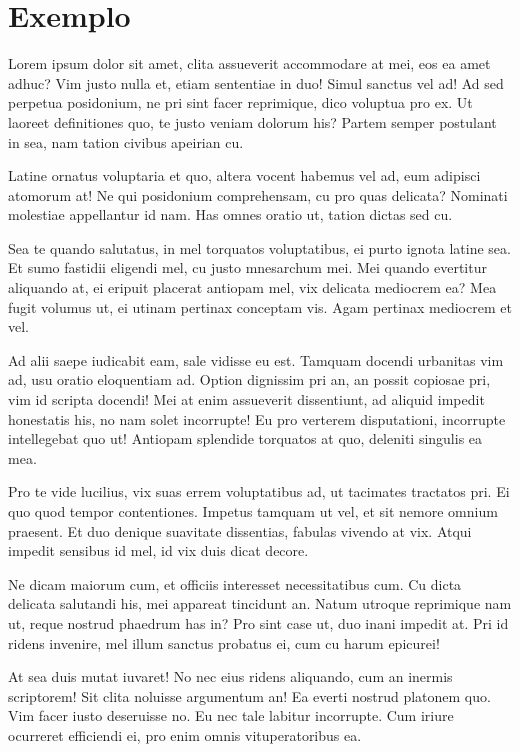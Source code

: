 \documentclass[
	12pt,				%
	openright,			%
	oneside,			%
	a4paper,			%
	english,			%
	french,				%
	spanish,			%
	brazil,				%
	]{abntex2}
\begin{document}
\section{Exemplo}

Lorem ipsum dolor sit amet, clita assueverit accommodare at mei, eos ea amet adhuc? Vim justo nulla et, etiam sententiae in duo! Simul sanctus vel ad! Ad sed perpetua posidonium, ne pri sint facer reprimique, dico voluptua pro ex. Ut laoreet definitiones quo, te justo veniam dolorum his? Partem semper postulant in sea, nam tation civibus apeirian cu.

Latine ornatus voluptaria et quo, altera vocent habemus vel ad, eum adipisci atomorum at! Ne qui posidonium comprehensam, cu pro quas delicata? Nominati molestiae appellantur id nam. Has omnes oratio ut, tation dictas sed cu.

Sea te quando salutatus, in mel torquatos voluptatibus, ei purto ignota latine sea. Et sumo fastidii eligendi mel, cu justo mnesarchum mei. Mei quando evertitur aliquando at, ei eripuit placerat antiopam mel, vix delicata mediocrem ea? Mea fugit volumus ut, ei utinam pertinax conceptam vis. Agam pertinax mediocrem et vel.

Ad alii saepe iudicabit eam, sale vidisse eu est. Tamquam docendi urbanitas vim ad, usu oratio eloquentiam ad. Option dignissim pri an, an possit copiosae pri, vim id scripta docendi! Mei at enim assueverit dissentiunt, ad aliquid impedit honestatis his, no nam solet incorrupte! Eu pro verterem disputationi, incorrupte intellegebat quo ut! Antiopam splendide torquatos at quo, deleniti singulis ea mea.

Pro te vide lucilius, vix suas errem voluptatibus ad, ut tacimates tractatos pri. Ei quo quod tempor contentiones. Impetus tamquam ut vel, et sit nemore omnium praesent. Et duo denique suavitate dissentias, fabulas vivendo at vix. Atqui impedit sensibus id mel, id vix duis dicat decore.

Ne dicam maiorum cum, et officiis interesset necessitatibus cum. Cu dicta delicata salutandi his, mei appareat tincidunt an. Natum utroque reprimique nam ut, reque nostrud phaedrum has in? Pro sint case ut, duo inani impedit at. Pri id ridens invenire, mel illum sanctus probatus ei, cum cu harum epicurei!

At sea duis mutat iuvaret! No nec eius ridens aliquando, cum an inermis scriptorem! Sit clita noluisse argumentum an! Ea everti nostrud platonem quo. Vim facer iusto deseruisse no. Eu nec tale labitur incorrupte. Cum iriure ocurreret efficiendi ei, pro enim omnis vituperatoribus ea.
\end{document}
